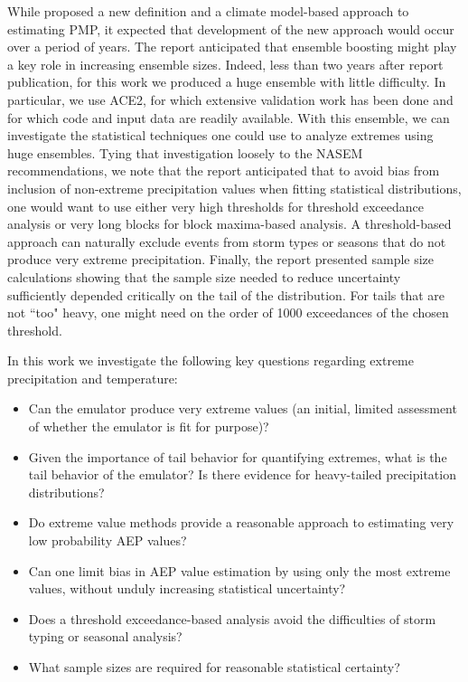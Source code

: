 \documentclass{ametsocV6.1}
\begin{document}
While \cite{nasem2024pmp} proposed a new definition and a climate model-based approach to estimating PMP, it expected that development of the new approach would occur over a period of years. The report anticipated that ensemble boosting might play a key role in increasing ensemble sizes. Indeed, less than two years after report publication, for this work we produced a huge ensemble with little difficulty. In particular, we use ACE2, for which extensive validation work has been done \citep{watt2025ace2} and for which code and input data are readily available. With this ensemble, we can investigate the statistical techniques one could use to analyze extremes using huge ensembles. Tying that investigation loosely to the NASEM recommendations, we note that the report anticipated that to avoid bias from inclusion of non-extreme precipitation values when fitting statistical distributions, one would want to use either very high thresholds  for threshold exceedance analysis or very long blocks for block maxima-based analysis. 
A threshold-based approach can naturally exclude events from storm types or seasons that do not produce very extreme precipitation. Finally, the report presented sample size calculations showing that the sample size needed to reduce uncertainty sufficiently depended critically on the tail of the distribution. For tails that are not ``too" heavy, one might need on the order of 1000 exceedances of the chosen threshold.


In this work we investigate the following key questions regarding extreme precipitation and temperature:

\begin{itemize}
\item Can the emulator produce very extreme values (an initial, limited assessment of whether the emulator is fit for purpose)?
\item  Given the importance of tail behavior for quantifying extremes, what is the tail behavior of the emulator? Is there evidence for heavy-tailed precipitation distributions?
\item Do extreme value methods provide a reasonable approach to estimating very low probability AEP values?
\item Can one limit bias in AEP value estimation by using only the most extreme values, without unduly increasing statistical uncertainty?
\item Does a threshold exceedance-based analysis avoid the difficulties of storm typing or seasonal analysis?
\item What sample sizes are required for reasonable statistical certainty?
\end{itemize}
\end{document}
